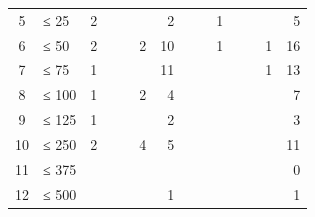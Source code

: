 \begin{table}
\begin{tabular}{
	c
	l
	r r c
	r r c
	r r c
	r r
	r
}
5
	& ≤ 25
	& 2 %
	& %
	& %
	& %
	& 2 %
	& %
	& %
	& 1 %
	& %
	& %
	& %
	& 5
	\\

6
	& ≤ 50
	& 2 %
	& %
	& %
	& 2 %
	& 10 %
	& %
	& %
	& 1 %
	& %
	& %
	& 1 %
	& 16
	\\

7
	& ≤ 75
	& 1 %
	& %
	& %
	& %
	& 11 %
	& %
	& %
	& %
	& %
	& %
	& 1 %
	& 13
	\\

8
	& ≤ 100
	& 1 %
	& %
	& %
	& 2 %
	& 4 %
	& %
	& %
	& %
	& %
	& %
	& %
	& 7
	\\

9
	& ≤ 125
	& 1 %
	& %
	& %
	& %
	& 2 %
	& %
	& %
	& %
	& %
	& %
	& %
	& 3
	\\

10
	& ≤ 250
	& 2 %
	& %
	& %
	& 4 %
	& 5 %
	& %
	& %
	& %
	& %
	& %
	& %
	& 11
	\\

11
	& ≤ 375
	& %
	& %
	& %
	& %
	& %
	& %
	& %
	& %
	& %
	& %
	& %
	& 0
	\\

12
	& ≤ 500
	& %
	& %
	& %
	& %
	& 1 %
	& %
	& %
	& %
	& %
	& %
	& %
	& 1
	\\


\end{tabular}
\end{table}
